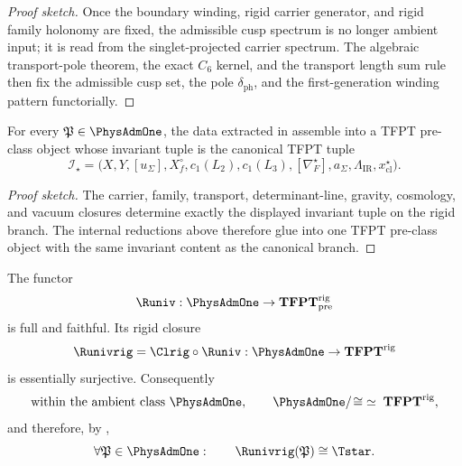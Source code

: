 \begin{proof}[Proof sketch]
Once the boundary winding, rigid carrier generator, and rigid family holonomy are fixed,
the admissible cusp spectrum is no longer ambient input; it is read from the singlet-projected
carrier spectrum. The algebraic transport-pole theorem, the exact $C_6$ kernel, and the transport
length sum rule then fix the admissible cusp set, the pole $\delta_{\mathrm{ph}}$, and the
first-generation winding pattern functorially.
\end{proof}

\begin{theorem}
\label{prop:universal-glueing}
For every $\mathfrak P\in\PhysAdmOne$, the data extracted in
assemble into a TFPT pre-class object whose invariant tuple is the canonical TFPT tuple
\[
\mathcal I_\star=
\bigl(
    X,Y,[u_\Sigma],X_f^\circ,c_1(L_2),c_1(L_3),[\nabla_F^\star],a_\Sigma,\Lambda_{\mathrm{IR}},x_{\mathrm{cl}}^\star
\bigr).
\]
\end{theorem}

\begin{proof}[Proof sketch]
The carrier, family, transport, determinant-line, gravity, cosmology, and vacuum closures
determine exactly the displayed invariant tuple on the rigid branch. The internal reductions above
therefore glue into one TFPT pre-class object with the same invariant content as the canonical
branch.
\end{proof}

\iffalse
\begin{theorem}
\label{thm:universality-tfpt}
The functor
\[
\Runiv:\PhysAdmOne\to \mathbf{TFPT}^{\mathrm{rig}}_{\mathrm{pre}}
\]
is full and faithful. Its rigid closure
\[
\Runivrig=\Clrig\circ \Runiv:\PhysAdmOne\to \mathbf{TFPT}^{\mathrm{rig}}
\]
is essentially surjective. Consequently
\[
\text{within the ambient class }\PhysAdmOne,\qquad
\PhysAdmOne/\!\cong\;\simeq\;\mathbf{TFPT}^{\mathrm{rig}},
\]
and therefore, by ,
\[
\forall \mathfrak P\in\PhysAdmOne:\qquad
\Runivrig(\mathfrak P)\cong \Tstar.
\]
\end{theorem}

